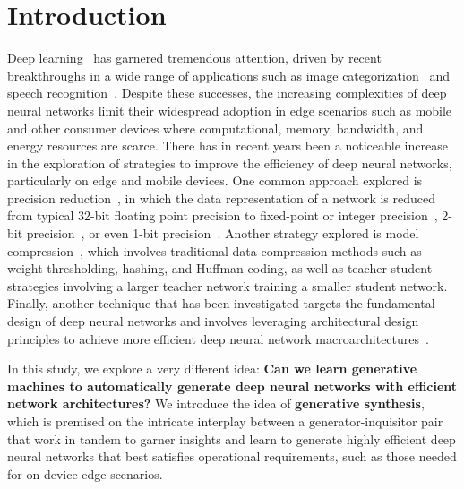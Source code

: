 \documentclass{article}
\begin{document}
\section{Introduction}
\vspace{-0.15in}
Deep learning~\cite{lecun2015deep} has garnered tremendous attention, driven by recent breakthroughs in a wide range of applications such as image categorization~\cite{krizhevsky2012imagenet} and speech recognition~\cite{DeepSpeech}.  Despite these successes, the increasing complexities of deep neural networks limit their widespread adoption in edge scenarios such as mobile and other consumer devices where computational, memory, bandwidth, and energy resources are scarce.  There has in recent years been a noticeable increase in the exploration of strategies to improve the efficiency of deep neural networks, particularly on edge and mobile devices. One common approach explored is precision reduction~\cite{Jacob,Meng2017,Courbariaux2015}, in which the data representation of a network is reduced from typical 32-bit floating point precision to fixed-point or integer precision~\cite{Jacob}, 2-bit precision~\cite{Meng2017}, or even 1-bit precision~\cite{Courbariaux2015}.   Another strategy explored is model compression~\cite{han2015deep,distillation,projectionnet}, which involves traditional data compression methods such as weight thresholding, hashing, and Huffman coding, as well as teacher-student strategies involving a larger teacher network training a smaller student network.  Finally, another technique that has been investigated targets the fundamental design of deep neural networks and involves leveraging architectural design principles to achieve more efficient deep neural network macroarchitectures~\cite{MobileNet,SqueezeNet,Squishednet,ShuffleNet}.

In this study, we explore a very different idea: \textbf{Can we learn generative machines to automatically generate deep neural networks with efficient network architectures?}  We introduce the idea of \textbf{generative synthesis}, which is premised on the intricate interplay between a generator-inquisitor pair that work in tandem to garner insights and learn to generate highly efficient deep neural networks that best satisfies operational requirements, such as those needed for on-device edge scenarios.
\vspace{-0.1in}
\end{document}
